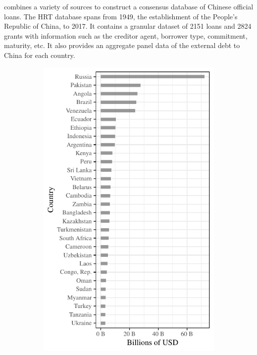 \citet*{Horn-Reinhart-Trebesch-21} combines a variety of sources to construct a consensus database of Chinese official loans.
The HRT database spans from 1949, the establishment of the People's Republic of China, to 2017. It contains a granular dataset of 2151 loans and 2824 grants with information such as the creditor agent, borrower type, commitment, maturity, etc. It also provides an aggregate panel data of the external debt to China for each country.
\begin{figure}[t]
    \centering
    \begin{subfigure}[t]{0.45\textwidth}
        \centering
        \includegraphics[width = \textwidth]{fig/total_debt.pdf}

\end{subfigure}
\end{figure}
